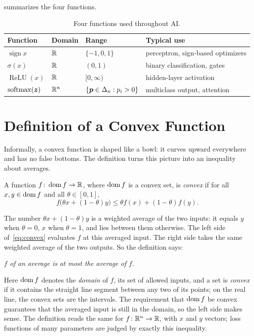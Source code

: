  summarizes the four functions.

\begin{table}[ht]
  \centering
  \caption{Four functions used throughout AI.}
  \label{tab:ch01-ai-functions}
  \begin{tabular}{@{}llll@{}}
    \toprule
    Function & Domain & Range & Typical use \\
    \midrule
    $\operatorname{sign} x$ & $\mathbb{R}$ & $\{-1, 0, 1\}$ & perceptron, sign-based optimizers \\
    $\sigma(x)$ & $\mathbb{R}$ & $(0, 1)$ & binary classification, gates \\
    $\operatorname{ReLU}(x)$ & $\mathbb{R}$ & $[0, \infty)$ & hidden-layer activation \\
    $\operatorname{softmax}(\bm{z})$ & $\mathbb{R}^n$ & $\{\bm{p} \in \Delta_n : p_i > 0\}$ & multiclass output, attention \\
    \bottomrule
  \end{tabular}
\end{table}

\section{Definition of a Convex Function}
\label{sec:ch01-definition}

Informally, a convex function is shaped like a bowl: it curves upward
everywhere and has no false bottoms. The definition turns this picture
into an inequality about averages.

\begin{definition}
  \label{def:convex}
  A function $f\colon \operatorname{dom} f \to \mathbb{R}$, where $\operatorname{dom} f$ is a convex set, is
  \emph{convex} if for all $x, y \in \operatorname{dom} f$ and all $\theta \in [0,1]$,
  \begin{equation}
    f\bigl(\theta x + (1-\theta) y\bigr) \le \theta f(x) + (1-\theta) f(y).
    \label{eq:convex}
  \end{equation}
\end{definition}

The number $\theta x + (1 - \theta) y$ is a weighted average of the two
inputs: it equals $y$ when $\theta = 0$, $x$ when $\theta = 1$, and lies
between them otherwise. The left side of~\eqref{eq:convex} evaluates $f$ at
this averaged input. The right side takes the same weighted average of the
two outputs. So the definition says:
\begin{center}
  \emph{$f$ of an average is at most the average of $f$.}
\end{center}
Here $\operatorname{dom} f$ denotes the \emph{domain} of $f$, its set of allowed inputs,
and a set is \emph{convex} if it contains the straight line segment
between any two of its points; on the real line, the convex sets are the
intervals. The requirement that $\operatorname{dom} f$ be convex guarantees that the
averaged input is still in the domain, so the left side makes sense. The definition reads
the same for $f\colon \mathbb{R}^n \to \mathbb{R}$, with $x$ and $y$ vectors; loss
functions of many parameters are judged by exactly this inequality.

